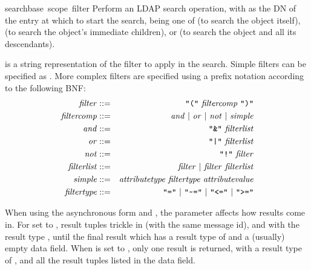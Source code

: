 
\begin{funcdesc}{search}{base\, scope\, filter}
Perform an LDAP search operation, with  as the DN of the entry
at which to start the search,  being one of 
 (to search the object itself), 
 (to search the object's immediate children), or
 (to search the object and all its descendants).

 is a string representation of the filter to apply in
the search. Simple filters can be specified as
. 
More complex filters are specified using a prefix notation according to 
the following BNF:
\begin{eqnarray*}
	\var{filter}	&::=& \code{"("} \ \var{filtercomp} \ \code{")"}
\\	\var{filtercomp}&::=& \var{and} \ |\ \var{or}\ |\ \var{not} 
			      \ |\ \var{simple}
\\	\var{and}	&::=& \code{"\&"} \ \var{filterlist}
\\	\var{or}	&::=& \code{"|"} \ \var{filterlist}
\\	\var{not}	&::=& \code{"!"} \ \var{filter}
\\	\var{filterlist}&::=& \var{filter} \ |\ \var{filter} \ \var{filterlist}
\\	\var{simple}	&::=& \var{attributetype}\ \var{filtertype} 
			      \ \var{attributevalue}
\\	\var{filtertype}&::=& \code{"="} \ |\ \code{"\~="}\ |\ \code{"<="}
		              \ |\ \code{">="}
\end{eqnarray*}

When using the asynchronous form and , the 
parameter affects how results come in.
For  set to , 
result tuples trickle in (with the same message id), and with the result
type , until the final result which has 
a result type of  and a (usually) empty data field.
When  is set to , only one result is returned, with a
result type of , and all the result tuples listed 
in the data field.


\end{funcdesc}

